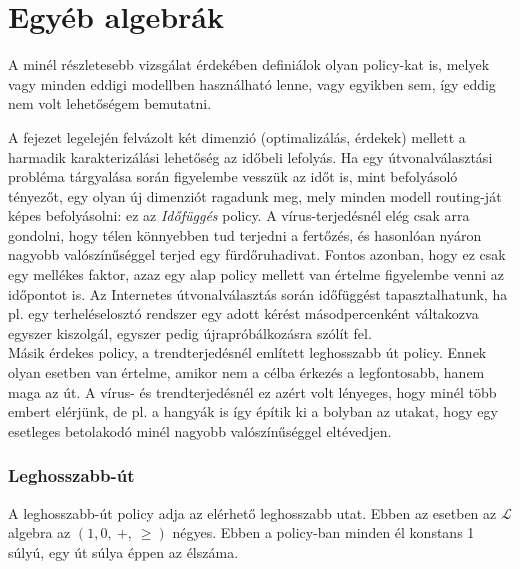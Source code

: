   \section{Egyéb algebrák}

  A minél részletesebb vizsgálat érdekében definiálok olyan policy-kat is, melyek vagy minden eddigi modellben használható lenne, vagy egyikben sem, így eddig nem volt lehetőségem bemutatni.

  A fejezet legelején felvázolt két dimenzió (optimalizálás, érdekek) mellett a harmadik karakterizálási lehetőség az időbeli lefolyás. Ha egy útvonalválasztási probléma tárgyalása során figyelembe vesszük az időt is, mint befolyásoló tényezőt, egy olyan új dimenziót ragadunk meg, mely minden modell routing-ját képes befolyásolni: ez az \textit{Időfüggés} policy. A vírus-terjedésnél elég csak arra gondolni, hogy télen könnyebben tud terjedni a fertőzés, és hasonlóan nyáron nagyobb valószínűséggel terjed egy fürdőruhadivat. Fontos azonban, hogy ez csak egy mellékes faktor, azaz egy alap policy mellett van értelme figyelembe venni az időpontot is. Az Internetes útvonalválasztás során időfüggést tapasztalhatunk, ha pl. egy terheléselosztó rendszer egy adott kérést másodpercenként váltakozva egyszer kiszolgál, egyszer pedig újrapróbálkozásra szólít fel.\\

  Másik érdekes policy, a trendterjedésnél említett leghosszabb út policy. Ennek olyan esetben van értelme, amikor nem a célba érkezés a legfontosabb, hanem maga az út. A vírus- és trendterjedésnél ez azért volt lényeges, hogy minél több embert elérjünk, de pl. a hangyák is így építik ki a bolyban az utakat, hogy egy esetleges betolakodó minél nagyobb valószínűséggel eltévedjen.

      \subsubsection{Leghosszabb-út}

      A leghosszabb-út policy adja az elérhető leghosszabb utat. Ebben az esetben az $\mathcal{L}$ algebra az $(1, 0,~+,~\geq)$ négyes. Ebben a policy-ban minden él konstans 1 súlyú, egy út súlya éppen az élszáma.

